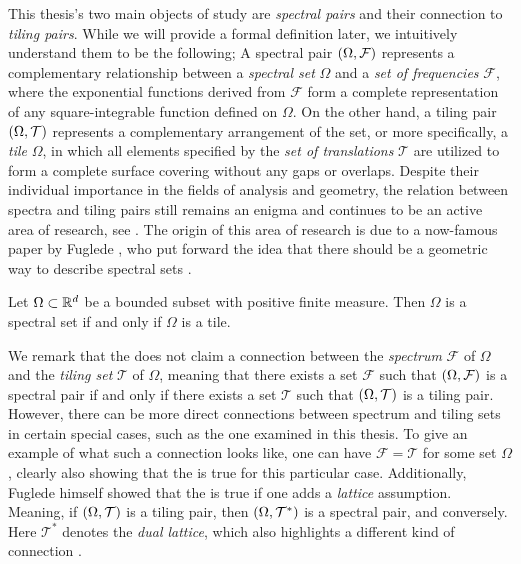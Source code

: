 \documentclass[../thesis.tex]{subfiles}
\begin{document}
This thesis's two main objects of study are \emph{spectral pairs} and their connection to \emph{tiling pairs}. While we will provide a formal definition later, we intuitively understand them to be the following; A spectral pair $(\Omega,\mathcal{F})$ represents a complementary relationship between a \emph{spectral set} $\Omega$ and a \emph{set of frequencies} $\mathcal{F}$, where the exponential functions derived from $\mathcal{F}$ form a complete representation of any square-integrable function defined on $\Omega$. On the other hand, a tiling pair $(\Omega,\mathcal{T})$ represents a complementary arrangement of the set, or more specifically, a \emph{tile} $\Omega$, in which all elements specified by the \emph{set of translations} $\mathcal{T}$ are utilized to form a complete surface covering without any gaps or overlaps. Despite their individual importance in the fields of analysis and geometry, the relation between spectra and tiling pairs still remains an enigma and continues to be an active area of research, see \cite{levFugledeConjectureConvex2022,kissFugledeConjectureHolds2022}. The origin of this area of research is due to a now-famous paper by Fuglede \cite{fugledeCommutingSelfadjointPartial1974}, who put forward the idea that there should be a geometric way to describe spectral sets \cite{lagariasOrthonormalBasesExponentials2000,liDualityPropertiesSpectra2010}. 

\begin{conjecture}\label{conj:fuglede}  
    Let $\Omega\subset \mathbb{R}^d$ be a bounded subset with positive finite measure. Then $\Omega$ is a spectral set if and only if $\Omega$ is a tile. 
\end{conjecture}

We remark that the  does not claim a connection between the \emph{spectrum} $\mathcal{F}$ of $\Omega$ and the \emph{tiling set} $\mathcal{T}$ of $\Omega$, meaning that there exists a set $\mathcal{F}$ such that $(\Omega,\mathcal{F})$ is a spectral pair if and only if there exists a set $\mathcal{T}$ such that $(\Omega,\mathcal{T})$ is a tiling pair. However, there can be more direct connections between spectrum and tiling sets in certain special cases, such as the one examined in this thesis. To give an example of what such a connection looks like, one can have $\mathcal{F}=\mathcal{T}$ for some set $\Omega$, clearly also showing that the  is true for this particular case. Additionally, Fuglede himself showed that the  is true if one adds a \emph{lattice} assumption. Meaning, if $(\Omega,\mathcal{T})$ is a tiling pair, then $(\Omega,\mathcal{T^*})$ is a spectral pair, and conversely. Here $\mathcal{T^*}$ denotes the \emph{dual lattice}, which also highlights a different kind of connection \cite{fugledeCommutingSelfadjointPartial1974}.
\end{document}
